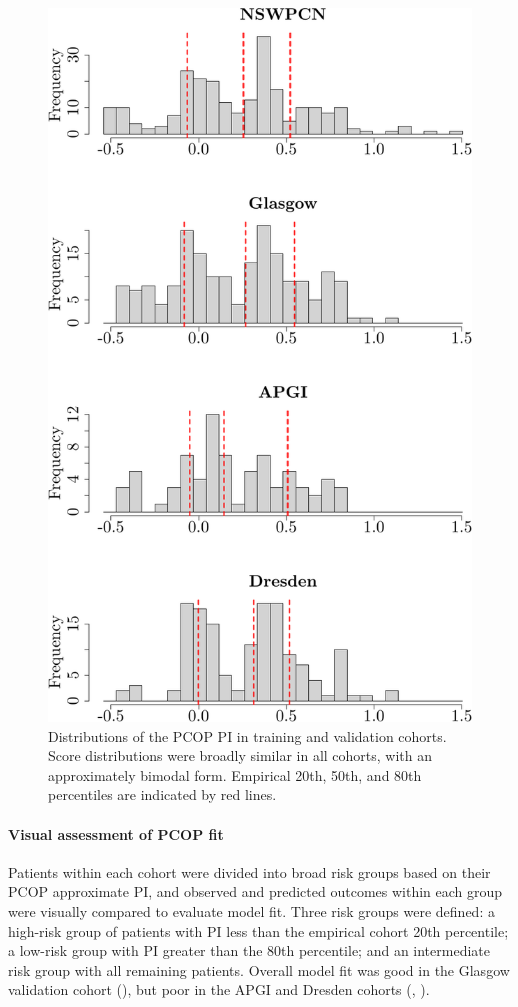 \documentclass[dissertation.tex]{subfiles}
\begin{document}
\begin{figure}[!htbp]
\centering
  \includegraphics[width=.7\linewidth]{analysis/nomogram/figure/07-score-hists-1}
  \caption[\texorpdfstring{\acrshort{PCOP}}{PCOP} \texorpdfstring{\acrshort{PI}}{PI} distributions in training and validation cohorts]{Distributions of the \acrshort{PCOP} \acrshort{PI} in training and validation cohorts.  Score distributions were broadly similar in all cohorts, with an approximately bimodal form.  Empirical 20th, 50th, and 80th percentiles are indicated by red lines.}
\label{fig:nomo-score-hists}
\end{figure}

\paragraph{Visual assessment of \texorpdfstring{\acrshort{PCOP}}{PCOP} fit}
Patients within each cohort were divided into broad risk groups based on their \gls{PCOP} approximate \gls{PI}, and observed and predicted outcomes within each group were visually compared to evaluate model fit.  Three risk groups were defined: a high-risk group of patients with \gls{PI} less than the empirical cohort 20th percentile; a low-risk group with \gls{PI} greater than the 80th percentile; and an intermediate risk group with all remaining patients.  Overall model fit was good in the Glasgow validation cohort (), but poor in the \gls{APGI} and Dresden cohorts (, ).  
\end{document}
